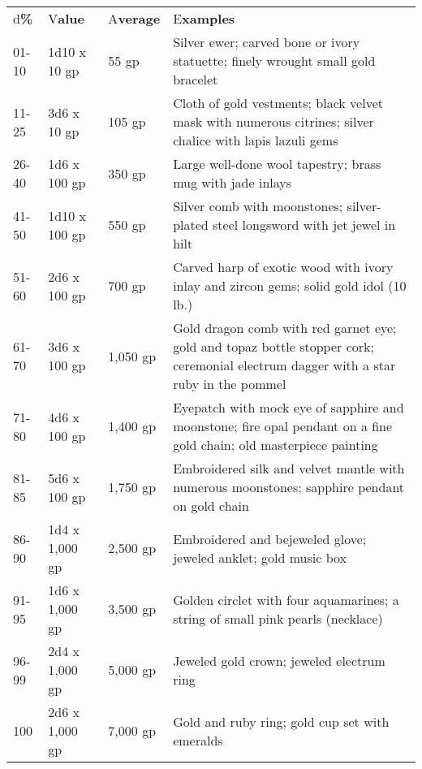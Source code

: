 \documentclass{article}
\begin{document}
\vspace{12pt}
\begin{tabular}{|>{\raggedright}p{20pt}|>{\raggedright}p{42pt}|>{\raggedright}p{26pt}|>{\raggedright}p{212pt}|}
\hline
\multicolumn{4}{|p{302pt}|}{T\textbf{able: Art Objects}}\tabularnewline
\hline
d\textbf{\%} & V\textbf{alue} & A\textbf{verage} & E\textbf{xamples}\tabularnewline
\hline
01-10 & 1d10 x 10 gp & 55 gp & Silver ewer; carved bone or ivory statuette; finely 
wrought small gold bracelet\tabularnewline
\hline
11-25 & 3d6 x 10 gp & 105 gp & Cloth of gold vestments; black velvet mask with 
numerous citrines; silver chalice with lapis lazuli gems\tabularnewline
\hline
26-40 & 1d6 x 100 gp & 350 gp & Large well-done wool tapestry; brass mug with jade 
inlays\tabularnewline
\hline
41-50 & 1d10 x 100 gp & 550 gp & Silver comb with moonstones; silver-plated steel 
longsword with jet jewel in hilt\tabularnewline
\hline
51-60 & 2d6 x 100 gp & 700 gp & Carved harp of exotic wood with ivory inlay and 
zircon gems; solid gold idol (10 lb.)\tabularnewline
\hline
61-70 & 3d6 x 100 gp & 1,050 gp & Gold dragon comb with red garnet eye; gold and 
topaz bottle stopper cork; ceremonial electrum dagger with a star ruby in the pommel\tabularnewline
\hline
71-80 & 4d6 x 100 gp & 1,400 gp & Eyepatch with mock eye of sapphire and moonstone; 
fire opal pendant on a fine gold chain; old masterpiece painting\tabularnewline
\hline
81-85 & 5d6 x 100 gp & 1,750 gp & Embroidered silk and velvet mantle with numerous 
moonstones; sapphire pendant on gold chain\tabularnewline
\hline
86-90 & 1d4 x 1,000 gp & 2,500 gp & Embroidered and bejeweled glove; jeweled anklet; 
gold music box\tabularnewline
\hline
91-95 & 1d6 x 1,000 gp & 3,500 gp & Golden circlet with four aquamarines; a string 
of small pink pearls (necklace)\tabularnewline
\hline
96-99 & 2d4 x 1,000 gp & 5,000 gp & Jeweled gold crown; jeweled electrum ring\tabularnewline
\hline
100 & 2d6 x 1,000 gp & 7,000 gp & Gold and ruby ring; gold cup set with emeralds\tabularnewline
\hline
\end{tabular}
\end{document}
